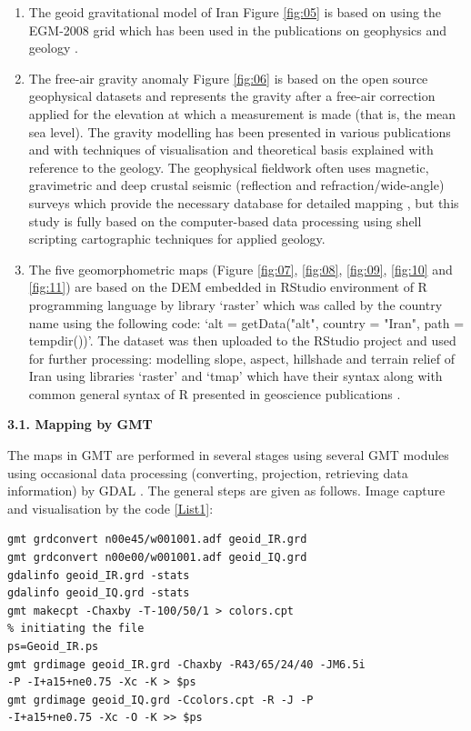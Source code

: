 \documentclass[12pt,a4paper,oneside]{article}
\def \newsubsection{\vspace{12pt}\textbf}
\def \newpar{\vspace{6pt}}
\begin{document}
\begin{enumerate}
	\item The geoid gravitational model of Iran Figure \ref{fig:05} is based on using the EGM-2008 grid \citep{Pavlis} which has been used in the publications on geophysics and geology \citep{Lemenkova2020h}.
	\item The free-air gravity anomaly Figure \ref{fig:06} is based on the open source geophysical datasets \citep{Sandwell1997,Sandwell2014} and represents the gravity after a free-air correction applied for the elevation at which a measurement is made (that is, the mean sea level). The gravity modelling has been presented in various publications \citep{Lemenkova2020i} and \citep{Djamour} with techniques of visualisation and theoretical basis explained with reference to the geology. The geophysical fieldwork often uses magnetic, gravimetric and deep crustal seismic (reflection and refraction/wide-angle) surveys which provide the necessary database for detailed mapping \citep{Lemenkova202140,Lemenkova202135,Lemenkova202127}, but this study is fully based on the computer-based data processing using shell scripting cartographic techniques for applied geology.
	\item The five geomorphometric maps (Figure \ref{fig:07}, \ref{fig:08}, \ref{fig:09}, \ref{fig:10} and \ref{fig:11}) are based on the DEM embedded in RStudio environment \citep{RStudio} of R programming language \citep{RCoreTeam} by library ‘raster’ which was called by the country name using the following code: ‘alt = getData("alt", country = "Iran", path = tempdir())’. The dataset was then uploaded to the RStudio project and used for further processing: modelling slope, aspect, hillshade and terrain relief of Iran using libraries ‘raster’ \citep{Hijmans} and ‘tmap’ \citep{Tennekes} which have their syntax along with common general syntax of R presented in geoscience publications \citep{Lemenkova2019b}.  
\end{enumerate}

\newsubsection {3.1. Mapping by GMT}

\newpar The maps in GMT are performed in several stages using several GMT modules \citep{Wessel2019} using occasional data processing (converting, projection, retrieving data information) by GDAL \citep{GDAL}. The general steps are given as follows. Image capture and visualisation by the code \ref{List1}:

\begin{lstlisting}[frame=single,basicstyle=\scriptsize]
gmt grdconvert n00e45/w001001.adf geoid_IR.grd
gmt grdconvert n00e00/w001001.adf geoid_IQ.grd
gdalinfo geoid_IR.grd -stats
gdalinfo geoid_IQ.grd -stats
gmt makecpt -Chaxby -T-100/50/1 > colors.cpt
% initiating the file
ps=Geoid_IR.ps
gmt grdimage geoid_IR.grd -Chaxby -R43/65/24/40 -JM6.5i 
-P -I+a15+ne0.75 -Xc -K > $ps
gmt grdimage geoid_IQ.grd -Ccolors.cpt -R -J -P 
-I+a15+ne0.75 -Xc -O -K >> $ps
\end{lstlisting}
\end{document}
